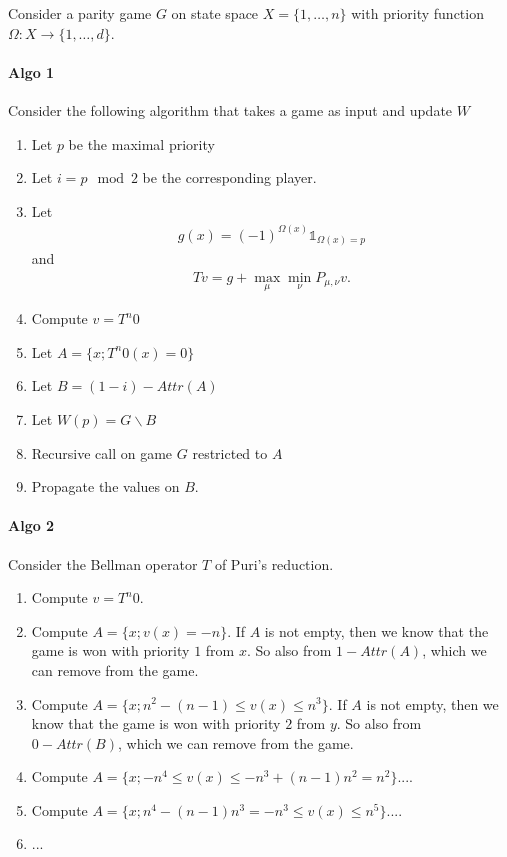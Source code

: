 \documentclass{article}
\def\1{{\mathds 1}}
\begin{document}
Consider a parity game $G$ on state space $X=\{1,\dots,n\}$ with priority function $\Omega:X \to \{1,\dots,d\}$.

\paragraph{Algo 1}

Consider the following algorithm that takes a game as input and update $W$
\begin{enumerate}
\item Let $p$ be the maximal priority
\item Let $i=p \mod 2$ be the corresponding player.
\item Let
  \begin{align}
    g(x) = (-1)^{\Omega(x)} \1_{\Omega(x)=p}
  \end{align}
  and
  \begin{align}
    T v = g + \max_\mu \min_\nu P_{\mu,\nu} v.
  \end{align}
  \item Compute $v=T^n 0$ 
  \item Let $A = \{ x ; T^n0(x)=0 \}$
  \item Let $B = (1-i)-Attr(A)$
  \item Let $W(p) = G \backslash B$
  \item Recursive call on game $G$ restricted to $A$
  \item Propagate the values on $B$.
\end{enumerate}


\paragraph{Algo 2}

Consider the Bellman operator $T$ of Puri's reduction.

\begin{enumerate}
\item Compute $v = T^n 0$.
\item Compute $A=\{ x ; v(x)=-n \}$. If $A$ is not empty, then we know that the game is won with priority $1$ from $x$. So also from $1-Attr(A)$, which we can remove from the game.
\item Compute $A=\{ x ; n^2-(n-1) \le v(x) \le n^3 \}$. If $A$ is not empty, then we know that the game is won with priority $2$ from $y$. So also from $0-Attr(B)$, which we can remove from the game.
\item Compute $A=\{ x ; -n^4 \le v(x) \le -n^3+(n-1)n^2=n^2 \}$....
\item Compute $A=\{ x ; n^4-(n-1)n^3 = -n^3 \le v(x) \le n^5 \}$....
\item ...
\end{enumerate}





 
\end{document}
